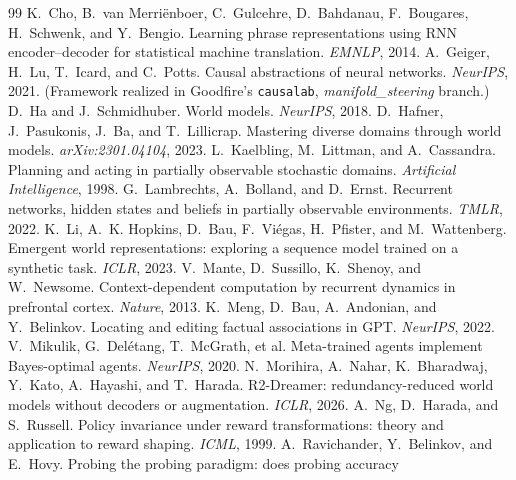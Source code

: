 \documentclass[11pt]{article}
\newcommand{\code}[1]{\texttt{\small #1}}
\begin{document}
\small
\begin{thebibliography}{99}
 K.~Cho, B.~van Merri\"enboer, C.~Gulcehre,
D.~Bahdanau, F.~Bougares, H.~Schwenk, and Y.~Bengio. Learning phrase
representations using RNN encoder--decoder for statistical machine translation.
\emph{EMNLP}, 2014.
 A.~Geiger, H.~Lu, T.~Icard, and
C.~Potts. Causal abstractions of neural networks. \emph{NeurIPS}, 2021.
(Framework realized in Goodfire's \code{causalab}, \emph{manifold\_steering}
branch.)
 D.~Ha and J.~Schmidhuber. World
models. \emph{NeurIPS}, 2018.
 D.~Hafner, J.~Pasukonis,
J.~Ba, and T.~Lillicrap. Mastering diverse domains through world models.
\emph{arXiv:2301.04104}, 2023.
 L.~Kaelbling, M.~Littman,
and A.~Cassandra. Planning and acting in partially observable stochastic domains.
\emph{Artificial Intelligence}, 1998.
 G.~Lambrechts,
A.~Bolland, and D.~Ernst. Recurrent networks, hidden states and beliefs in
partially observable environments. \emph{TMLR}, 2022.
 K.~Li, A.~K. Hopkins, D.~Bau,
F.~Vi\'egas, H.~Pfister, and M.~Wattenberg. Emergent world representations:
exploring a sequence model trained on a synthetic task. \emph{ICLR}, 2023.
 V.~Mante, D.~Sussillo, K.~Shenoy,
and W.~Newsome. Context-dependent computation by recurrent dynamics in prefrontal
cortex. \emph{Nature}, 2013.
 K.~Meng, D.~Bau, A.~Andonian, and
Y.~Belinkov. Locating and editing factual associations in GPT. \emph{NeurIPS},
2022.
 V.~Mikulik, G.~Del\'etang,
T.~McGrath, et al. Meta-trained agents implement Bayes-optimal agents.
\emph{NeurIPS}, 2020.
 N.~Morihira, A.~Nahar,
K.~Bharadwaj, Y.~Kato, A.~Hayashi, and T.~Harada. R2-Dreamer: redundancy-reduced
world models without decoders or augmentation. \emph{ICLR}, 2026.
 A.~Ng, D.~Harada, and S.~Russell. Policy
invariance under reward transformations: theory and application to reward
shaping. \emph{ICML}, 1999.
 A.~Ravichander,
Y.~Belinkov, and E.~Hovy. Probing the probing paradigm: does probing accuracy

\end{thebibliography}
\end{document}
